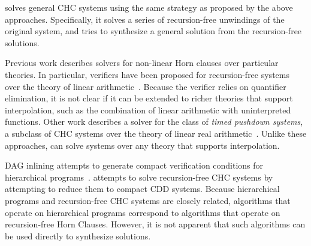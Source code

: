 \sys solves general CHC systems using the same strategy as proposed by
the above approaches.
%
Specifically, it solves a series of recursion-free unwindings of the
original system, and tries to synthesize a general solution from the
recursion-free solutions.

Previous work describes solvers for non-linear Horn clauses over
particular theories.
%
In particular, verifiers have been proposed for recursion-free systems
over the theory of linear arithmetic~\cite{komuravelli14}.
%
Because the verifier relies on quantifier elimination, it is not clear
if it can be extended to richer theories that support interpolation,
such as the combination of linear arithmetic with uninterpreted
functions.
%
Other work describes a solver for the class of \emph{timed pushdown
systems}, a subclass of CHC systems over the theory of linear real
arithmetic~\cite{hoder12}.
%
Unlike these approaches, \sys can solve systems over any theory that
supports interpolation.

DAG inlining attempts to generate compact verification conditions for
hierarchical programs~\cite{lal-qadeer15}.
%
\sys attempts to solve recursion-free CHC systems by attempting to
reduce them to compact CDD systems.
%
Because hierarchical programs and recursion-free CHC systems are
closely related, algorithms that operate on hierarchical programs
correspond to algorithms that operate on recursion-free Horn Clauses.
%
However, it is not apparent that such algorithms can be used directly
to synthesize solutions.
